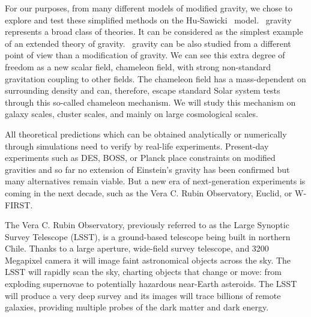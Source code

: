 For our purposes, from many different models of modified gravity, we chose to explore and test these simplified methods on the Hu-Sawicki \fR\ model. \fR\ gravity represents a broad class of theories. It can be considered as the simplest example of an extended theory of gravity. \fR\ gravity can be also studied from a different point of view than a modification of gravity. We can see this extra degree of freedom as a new scalar field, chameleon field, with strong non-standard gravitation coupling to other fields. The chameleon field has a mass-dependent on surrounding density and can, therefore, escape standard Solar system tests through this so-called chameleon mechanism. We will study this mechanism on galaxy scales, cluster scales, and mainly on large cosmological scales.

All theoretical predictions which can be obtained analytically or numerically through simulations need to verify by real-life experiments. Present-day experiments such as DES, BOSS, or Planck place constraints on modified gravities and so far no extension of Einstein's gravity has been confirmed but many alternatives remain viable. But a new era of next-generation experiments is coming in the next decade, such as the Vera C. Rubin Observatory, Euclid, or W-FIRST.

The Vera C. Rubin Observatory, previously referred to as the Large Synoptic Survey Telescope (LSST), is a ground-based telescope being built in northern Chile. Thanks to a large aperture, wide-field survey telescope, and 3200 Megapixel camera it will image faint astronomical objects across the sky. The LSST will rapidly scan the sky, charting objects that change or move: from exploding supernovae to potentially hazardous near-Earth asteroids. The LSST will produce a very deep survey and its images will trace billions of remote galaxies, providing multiple probes of the dark matter and dark energy.

